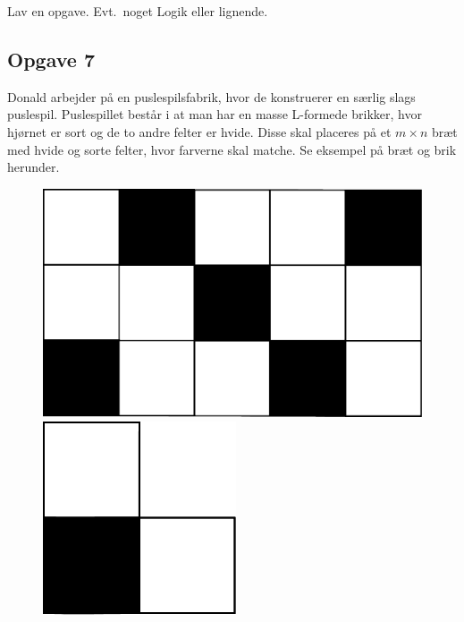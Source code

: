 Lav en opgave. Evt.~noget Logik eller lignende.

\subsection{Opgave 7}
Donald arbejder på en puslespilsfabrik, hvor de konstruerer en særlig slags
puslespil. Puslespillet består i at man har en masse L-formede brikker, hvor
hjørnet er sort og de to andre felter er hvide. Disse skal placeres på et
$m\times n$ bræt med hvide og sorte felter, hvor farverne skal matche. Se
eksempel på bræt og brik herunder.

\begin{figure}[htbp]
    \centering
    \vspace*{15pt}
    \begin{minipage}[h]{0.55\linewidth}
        \centering
        \includegraphics[width=\textwidth]{figures/braet.pdf}
    \end{minipage}
    \hspace*{.1\linewidth}
    \begin{minipage}[h]{0.2\linewidth}
        \centering
        \includegraphics[width=\textwidth]{figures/brik.pdf}

\end{minipage}
\end{figure}
